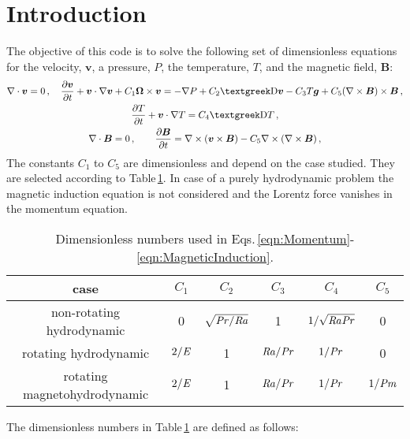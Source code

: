 \section{Introduction}
The objective of this code is to solve the following set of dimensionless equations for the velocity, $\bm{v}$, a pressure, $P$, the temperature, $T$, and the magnetic field, $\bm{B}$:
\begin{gather}
	\nabla\cdot\bm{v}=0\,,\quad
	\pd{\bm{v}}{t}+\bm{v}\cdot\nabla\bm{v}+C_1\bm{\Omega}\times\bm{v}=-\nabla P+C_2\laplace\bm{v}-C_3T\bm{g}+C_5(\nabla\times\bm{B})\times\bm{B}\,,\label{eqn:Momentum}\\
	\pd{T}{t}+\bm{v}\cdot\nabla T=C_4\laplace T\,,\label{eqn:Energy}\\
	\nabla\cdot\bm{B}=0\,,\qquad
	\pd{\bm{B}}{t}=\nabla\times(\bm{v}\times\bm{B})-C_5\nabla\times(\nabla\times\bm{B})\,,\label{eqn:MagneticInduction}
\end{gather}
The constants $C_1$ to $C_5$ are dimensionless and depend on the case studied. They are selected according to Table\,\ref{tbl:Dimensionless}. In case of a purely hydrodynamic problem the magnetic induction equation is not considered and the Lorentz force vanishes in the momentum equation.
\begin{table}[!htb]
	\centering
	\caption{Dimensionless numbers used in Eqs.\,\eqref{eqn:Momentum}-\eqref{eqn:MagneticInduction}.\label{tbl:Dimensionless}}
	\begin{tabular}{cccccc}
		\toprule
		case & $C_1$ & $C_2$ & $C_3$ & $C_4$ & $C_5$ \\\midrule
		non-rotating hydrodynamic & 0 & $\sqrt{\mathit{Pr}/\mathit{Ra}}$ & 1 & $1/\sqrt{\mathit{Ra}\mathit{Pr}}$ & 0\\
		rotating hydrodynamic & $2/\mathit{E}$ & 1 & $\mathit{Ra}/\mathit{Pr}$ & $1/\mathit{Pr}$ & 0\\
		rotating magnetohydrodynamic & $2/\mathit{E}$ & 1 & $\mathit{Ra}/\mathit{Pr}$ & $1/\mathit{Pr}$ & $1/\mathit{Pm}$\\
		\bottomrule
	\end{tabular}
\end{table}
The dimensionless numbers in Table\,\ref{tbl:Dimensionless} are defined as follows:
